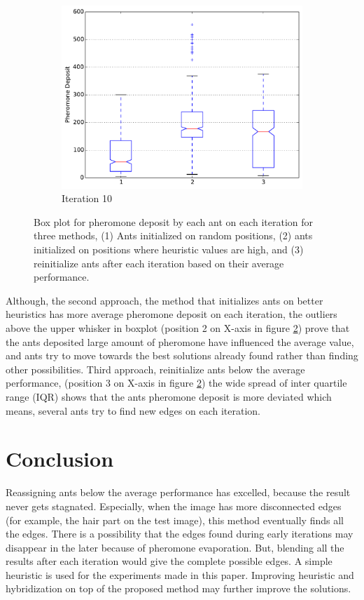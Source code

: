 \documentclass{llncs}
\begin{document}
\begin{figure}[H]
\begin{subfigure}[b]{0.3\textwidth}
                \includegraphics[width=\textwidth]{PLT/Comparision/BOXPLOT/Iteration10}
                \caption{Iteration 10}
                \label{fig:plt_iter10}
        \end{subfigure}
        \caption{Box plot for pheromone deposit by each ant on each iteration for three methods, (1) Ants initialized on random positions, (2) ants initialized on positions where heuristic values are high, and (3) reinitialize ants after each iteration based on their average performance.}\label{fig:box_plt}
	\end{figure}
	
	Although, the second approach, the method that initializes ants on better heuristics has more average pheromone deposit on each iteration, the outliers above the upper whisker in boxplot (position 2 on X-axis in figure \ref{fig:box_plt}) prove that the ants deposited large amount of pheromone have influenced the average value, and ants try to move towards the best solutions already found rather than finding other possibilities. Third approach, reinitialize ants below the average performance, (position 3 on X-axis in figure \ref{fig:box_plt}) the wide spread of inter quartile range (IQR) shows that the ants pheromone deposit is more deviated which means, several ants try to find new edges on each iteration.
	
	\section{Conclusion}\label{sec:conclusion}
	Reassigning ants below the average performance has excelled, because the result never gets stagnated. Especially, when the image has more disconnected edges (for example, the hair part on the test image), this method eventually finds all the edges. There is a possibility that the edges found during early iterations may disappear in the later because of pheromone evaporation. But, blending all the results after each iteration would give the complete possible edges. A simple heuristic is used for the experiments made in this paper. Improving heuristic and hybridization on top of the proposed method may further improve the solutions.
	
	
	
	
	
	\nocite{*}
	
\end{document}
